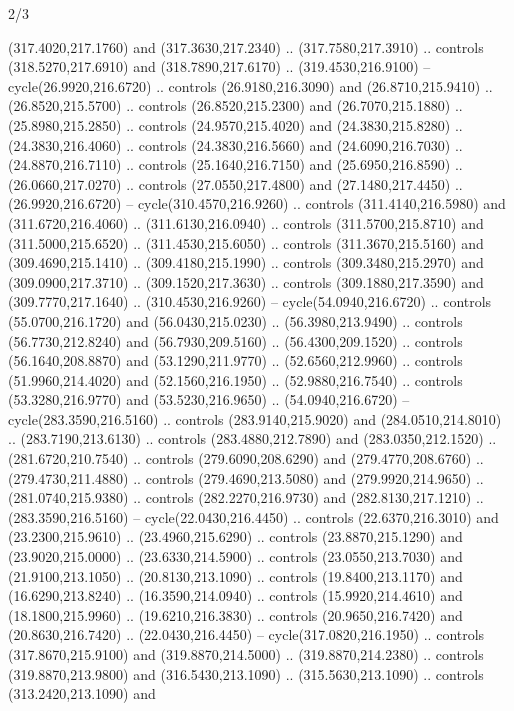 \begin{flagdescription}{2/3}
\begin{scope}[xshift=0.5\flaglength,yshift=0.5\flagwidth,scale=\stretchfactor]
\begin{scope}[scale=0.001645\flagwidth,yshift=65mm,xshift=-63mm]
\begin{scope}[y=0.80pt, x=0.80pt, yscale=-1,]
\begin{scope}[cm={{1.33333,0.0,0.0,1.33333,(0.0,1e-05)}}]
  (317.4020,217.1760) and (317.3630,217.2340) .. (317.7580,217.3910) .. controls
  (318.5270,217.6910) and (318.7890,217.6170) .. (319.4530,216.9100) --
  cycle(26.9920,216.6720) .. controls (26.9180,216.3090) and (26.8710,215.9410)
  .. (26.8520,215.5700) .. controls (26.8520,215.2300) and (26.7070,215.1880) ..
  (25.8980,215.2850) .. controls (24.9570,215.4020) and (24.3830,215.8280) ..
  (24.3830,216.4060) .. controls (24.3830,216.5660) and (24.6090,216.7030) ..
  (24.8870,216.7110) .. controls (25.1640,216.7150) and (25.6950,216.8590) ..
  (26.0660,217.0270) .. controls (27.0550,217.4800) and (27.1480,217.4450) ..
  (26.9920,216.6720) -- cycle(310.4570,216.9260) .. controls (311.4140,216.5980)
  and (311.6720,216.4060) .. (311.6130,216.0940) .. controls (311.5700,215.8710)
  and (311.5000,215.6520) .. (311.4530,215.6050) .. controls (311.3670,215.5160)
  and (309.4690,215.1410) .. (309.4180,215.1990) .. controls (309.3480,215.2970)
  and (309.0900,217.3710) .. (309.1520,217.3630) .. controls (309.1880,217.3590)
  and (309.7770,217.1640) .. (310.4530,216.9260) -- cycle(54.0940,216.6720) ..
  controls (55.0700,216.1720) and (56.0430,215.0230) .. (56.3980,213.9490) ..
  controls (56.7730,212.8240) and (56.7930,209.5160) .. (56.4300,209.1520) ..
  controls (56.1640,208.8870) and (53.1290,211.9770) .. (52.6560,212.9960) ..
  controls (51.9960,214.4020) and (52.1560,216.1950) .. (52.9880,216.7540) ..
  controls (53.3280,216.9770) and (53.5230,216.9650) .. (54.0940,216.6720) --
  cycle(283.3590,216.5160) .. controls (283.9140,215.9020) and
  (284.0510,214.8010) .. (283.7190,213.6130) .. controls (283.4880,212.7890) and
  (283.0350,212.1520) .. (281.6720,210.7540) .. controls (279.6090,208.6290) and
  (279.4770,208.6760) .. (279.4730,211.4880) .. controls (279.4690,213.5080) and
  (279.9920,214.9650) .. (281.0740,215.9380) .. controls (282.2270,216.9730) and
  (282.8130,217.1210) .. (283.3590,216.5160) -- cycle(22.0430,216.4450) ..
  controls (22.6370,216.3010) and (23.2300,215.9610) .. (23.4960,215.6290) ..
  controls (23.8870,215.1290) and (23.9020,215.0000) .. (23.6330,214.5900) ..
  controls (23.0550,213.7030) and (21.9100,213.1050) .. (20.8130,213.1090) ..
  controls (19.8400,213.1170) and (16.6290,213.8240) .. (16.3590,214.0940) ..
  controls (15.9920,214.4610) and (18.1800,215.9960) .. (19.6210,216.3830) ..
  controls (20.9650,216.7420) and (20.8630,216.7420) .. (22.0430,216.4450) --
  cycle(317.0820,216.1950) .. controls (317.8670,215.9100) and
  (319.8870,214.5000) .. (319.8870,214.2380) .. controls (319.8870,213.9800) and
  (316.5430,213.1090) .. (315.5630,213.1090) .. controls (313.2420,213.1090) and

\end{scope}
\end{scope}
\end{scope}
\end{scope}
\end{flagdescription}

